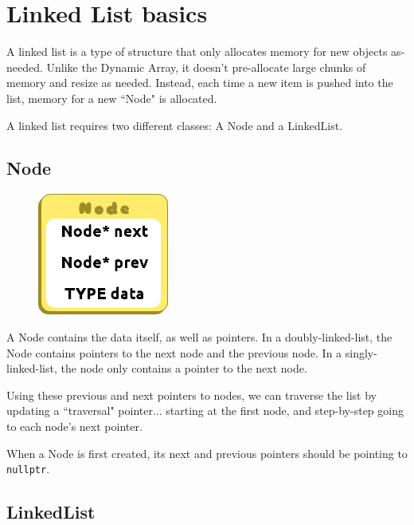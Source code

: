 \documentclass[a4paper,12pt,onepage]{book}
\begin{document}
    \newpage
    \section*{Linked List basics}

        A linked list is a type of structure that only allocates memory for new objects as-needed.
        Unlike the Dynamic Array, it doesn't pre-allocate large chunks of memory and resize as 
        needed. Instead, each time a new item is pushed into the list, memory for a new ``Node" 
        is allocated.

        A linked list requires two different classes: A Node and a LinkedList.

    \subsection*{Node}
        
        \begin{figure}
        \includegraphics[height=4cm]{images/justanode.png}
        \end{figure}
    
        A Node contains the data itself, as well as pointers. In a doubly-linked-list, 
        the Node contains pointers to the next node and the previous node.
        In a singly-linked-list, the node only contains a pointer to the next node.

        Using these previous and next pointers to nodes, we can traverse the list by updating 
        a ``traversal" pointer... starting at the first node, and step-by-step going 
        to each node's next pointer.
        
        When a Node is first created, its next and previous pointers should
        be pointing to \texttt{nullptr}.
    
    \subsection*{LinkedList}
        
\end{document}
